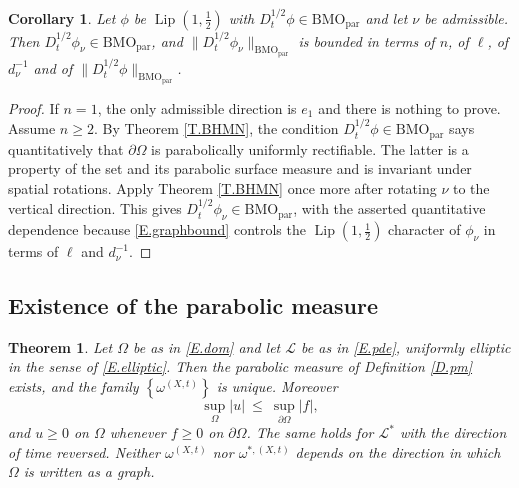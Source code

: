 \documentclass[12pt,leqno]{amsart}
\numberwithin{equation}{section}
\DeclareMathOperator{\Lip}{Lip}
\newcommand{\abs}[1]{\left\vert#1\right\vert}
\newcommand{\set}[1]{\left\{#1\right\}}
\newcommand{\om}{\Omega}
\newcommand{\pom}{\partial\Omega}
\newcommand{\pd}{\partial}
\newcommand{\dhalf}{D_t^{1/2}}
\newcommand{\BMOpar}{\mathrm{BMO}_{\mathrm{par}}}
\newcommand{\LL}{\mathcal L}
\theoremstyle{plain}
\newtheorem{theorem}[equation]{Theorem}
\newtheorem{corollary}[equation]{Corollary}
\theoremstyle{remark}
\begin{document}
\begin{corollary}\label{C.BHMN}
Let $\phi$ be $\Lip(1,\tfrac12)$ with $\dhalf\phi\in\BMOpar$ and let $\nu$ be
admissible. Then $\dhalf\phi_\nu\in\BMOpar$, and
$\|\dhalf\phi_\nu\|_{\BMOpar}$ is bounded in terms of $n$, of $\ell$, of
$d_\nu^{-1}$ and of $\|\dhalf\phi\|_{\BMOpar}$.
\end{corollary}

\begin{proof}
If $n=1$, the only admissible direction is $e_1$ and there is nothing to
prove. Assume $n\ge2$. By Theorem \ref{T.BHMN}, the condition
$\dhalf\phi\in\BMOpar$ says quantitatively that $\pd\om$ is parabolically
uniformly rectifiable. The latter is a property of the set and its parabolic
surface measure and is invariant under spatial rotations. Apply Theorem
\ref{T.BHMN} once more after rotating $\nu$ to the vertical direction. This
gives $\dhalf\phi_\nu\in\BMOpar$, with the asserted quantitative dependence
because \eqref{E.graphbound} controls the $\Lip(1,\tfrac12)$ character of
$\phi_\nu$ in terms of $\ell$ and $d_\nu^{-1}$.
\end{proof}

\subsection{Existence of the parabolic measure}\label{ss.pmproof}

\begin{theorem}\label{T.pmeasure}
Let $\om$ be as in \eqref{E.dom} and let $\LL$ be as in \eqref{E.pde},
uniformly elliptic in the sense of \eqref{E.elliptic}. Then the parabolic
measure of Definition \ref{D.pm} exists, and the family
$\set{\omega^{(X,t)}}$ is unique. Moreover
\begin{equation}\label{E.maxpr}
  \sup_\om\abs u\ \le\ \sup_{\pom}\abs f ,
\end{equation}
and $u\ge0$ on $\om$ whenever $f\ge0$ on $\pom$. The same holds for $\LL^*$
with the direction of time reversed. Neither $\omega^{(X,t)}$ nor
$\omega^{*,(X,t)}$ depends on the direction in which $\om$ is written as a
graph.
\end{theorem}
\end{document}
